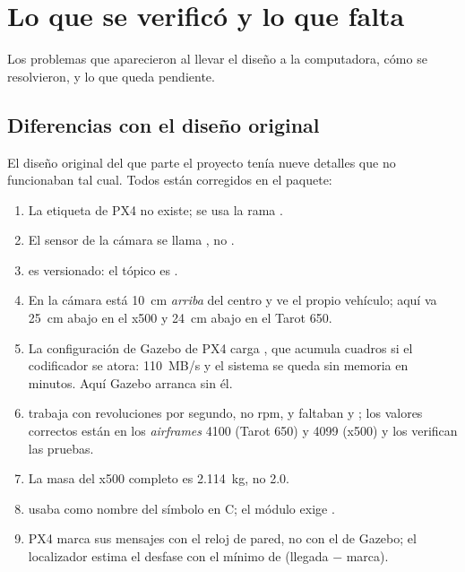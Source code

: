 \chapter{Lo que se verificó y lo que falta}

\begin{enpocas}
Los problemas que aparecieron al llevar el diseño a la computadora, cómo se resolvieron, y lo que queda
pendiente.
\end{enpocas}

\section{Diferencias con el diseño original}

El diseño original del que parte el proyecto tenía nueve detalles que no funcionaban tal cual. Todos
están corregidos en el paquete:
\begin{enumerate}
  \item La etiqueta  de PX4 no existe; se usa la rama .
  \item El sensor de la cámara se llama , no .
  \item {} es versionado: el tópico es .
  \item En  la cámara está 10~cm \emph{arriba} del centro y ve el propio
        vehículo; aquí va 25~cm abajo en el x500 y 24~cm abajo en el Tarot 650.
  \item La configuración de Gazebo de PX4 carga , que acumula cuadros si el
        codificador se atora: 110~MB/s y el sistema se queda sin memoria en minutos. Aquí Gazebo
        arranca sin él.
  \item {} trabaja con revoluciones por segundo, no rpm, y faltaban
         y ; los valores correctos están en los \emph{airframes}
        4100 (Tarot 650) y 4099 (x500) y los verifican las pruebas.
  \item La masa del x500 completo es 2.114~kg, no 2.0.
  \item {} usaba  como nombre del símbolo en C; el módulo exige
        .
  \item PX4 marca sus mensajes con el reloj de pared, no con el de Gazebo; el localizador estima el
        desfase con el mínimo de (llegada $-$ marca).
\end{enumerate}


